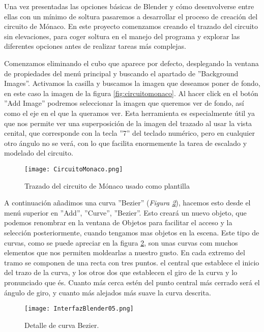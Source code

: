 Una vez presentadas las opciones básicas de Blender y cómo desenvolverse entre ellas con un mínimo de soltura pasaremos a desarrollar el proceso de creación del circuito de Mónaco. En este proyecto comenzamos creando el trazado del circuito  sin elevaciones, para coger soltura en el manejo del programa y explorar las diferentes opciones antes de realizar tareas más complejas.

Comenzamos eliminando el cubo que aparece por defecto, desplegando la ventana de propiedades del menú principal y buscando el apartado de ”Background Images”. Activamos la casilla y buscamos la imagen que deseamos poner de fondo, en este caso la imagen de la figura \ref{fig:circuitomonaco}. Al hacer click en el botón ”Add Image” podremos seleccionar la imagen que queremos ver de fondo, así como el eje en el que la queramos ver. Esta herramienta es especialmente útil ya que  nos permite ver una superposición de la imagen del trazado al usar la vista cenital, que corresponde con la tecla ”7” del teclado numérico, pero en cualquier otro ángulo no se verá, con lo que facilita enormemente la tarea de escalado y modelado del circuito.

\begin{figure}[ht]
	\centering
	\texttt{[image: CircuitoMonaco.png]}
	\caption{Trazado del circuito de Mónaco usado como plantilla} \label{fig:circuitomonaco.}
\end{figure}

A continuación añadimos una curva ”Bezier” (\textit{Figura \ref{fig:interfazblender05}}), hacemos esto desde el menú superior en ”Add”, ”Curve”, ”Bezier”. Esto creará un nuevo objeto, que podemos renombrar en la ventana de Objetos para facilitar el acceso y la selección posteriormente, cuando tengamos mas objetos en la escena. Este tipo de curvas, como se puede apreciar en la figura \ref{fig:interfazblender05}, son unas curvas com muchos elementos que nos permiten moldearlas a nuestro gusto. En cada extremo del tramo se componen de una recta con tres puntos. el central que establece el inicio del trazo de la curva, y los otros dos que establecen el giro de la curva y lo pronunciado que és. Cuanto más cerca estén del punto central más cerrado será el ángulo de giro, y cuanto más alejados más suave la curva descrita.

\begin{figure}[h]
	\centering
	\texttt{[image: InterfazBlender05.png]}
	\caption{Detalle de curva Bezier.} \label{fig:interfazblender05}
\end{figure}

